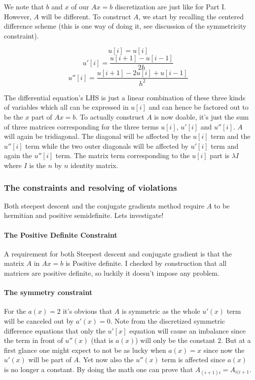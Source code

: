 \documentclass[a4paper,11pt]{article}
\begin{document}
We note that $b$ and $x$ of our $Ax=b$ discretization are just like for
Part I.  However, $A$ will be different. To construct $A$, we start by
recalling the centered difference scheme (this is one way of doing it,
see discussion of the symmetricity constraint).

\[
  u[i] = u[i]
\]
\[
  u'[i] = \frac{u[i+1]-u[i-1]}{2h}
\]
\[
  u''[i] = \frac{u[i+1]-2u[i]+u[i-1]}{h^2}
\]

The differential equation's LHS is just a linear combination of these
three kinds of variables which all can be expressed in $u[i]$ and can
hence be factored out to be the $x$ part of $Ax=b$. To actually
construct $A$ is now doable, it's just the sum of three matrices
corresponding for the three terms $u[i]$, $u'[i]$ and $u''[i]$. $A$ will
again be tridiagonal. The diagonal will be affected by the $u[i]$ term
and the $u''[i]$ term while the two outer diagonals will be affected by
$u'[i]$ term and again the $u''[i]$ term. The matrix term corresponding
to the $u[i]$ part is $\lambda I$ where $I$ is the $n$ by $n$ identity
matrix.

\subsubsection{The constraints and resolving of violations}

Both steepest descent and the conjugate gradients method require
$A$ to be hermitian and positive semidefinite. Lets investigate!

\paragraph{The Positive Definite Constraint}

A requirement for both Steepest descent and conjugate gradient is that
the matrix $A$ in $Ax=b$ is Positive definite. I checked by construction
that all matrices are positive definite, so luckily it doesn't impose
any problem.

\paragraph{The symmetry constraint}

For the $a(x) = 2$ it's obvious that $A$ is symmetric as the whole
$u'(x)$ term will be canceled out by $a'(x) = 0$. Note from the
discretized symmetric difference equations that only the $u'[x]$
equation will cause an imbalance since the term in front of $u''(x)$
(that is $a(x)$) will only be the constant $2$. But at a first glance
one might expect to not be as lucky when $a(x) = x$ since now the
$u'(x)$ will be part of $A$.  Yet now also the $u''(x)$ term is affected
since $a(x)$ is no longer a constant. By doing the math one can prove
that $A_{(i+1)i} = A_{i(i+1}$.
\end{document}
